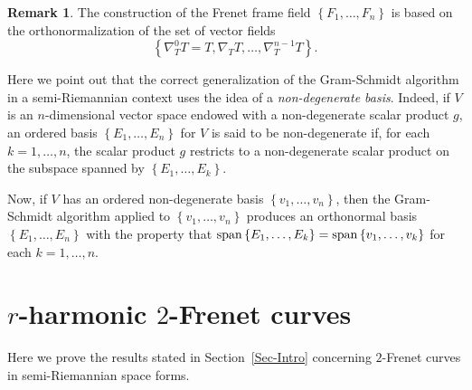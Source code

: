\documentclass[11pt]{amsart}
\theoremstyle{plain}
\theoremstyle{definition}
\newtheorem{remark}       [theorem]  {Remark}
\numberwithin{equation}{section}
\begin{document}
\begin{remark} 
The construction of the Frenet frame field $\left \{F_1,\ldots,F_n \right \}$ is based on the orthonormalization of the set of vector fields 
\[
\left \{\nabla_T^0T=T,\nabla_T T,\ldots,\nabla_T^{n-1}T \right \}.
\] 

Here we point out that the correct generalization of the Gram-Schmidt algorithm in a semi-Riemannian context uses the idea of a {\em non-degenerate basis}. Indeed, if $V$ is an $n$-dimensional vector space endowed with a non-degenerate scalar product $g$, an ordered basis $\left \{E_1,\ldots,E_n\right\}$
 for $V$
 is said to be non-degenerate if, for each $k=1,\ldots,n$, the scalar product $g$ restricts to a non-degenerate scalar product on the subspace spanned by $\left \{E_1,\ldots,E_k\right\}$.

Now, if $V$ has an ordered non-degenerate basis $\left \{v_1,\ldots,v_n\right\}$, then the Gram-Schmidt algorithm applied to $\left \{v_1,\ldots,v_n\right\}$ produces an orthonormal basis $\left \{E_1,\ldots,E_n\right\}$ with the property that ${\rm span}\left \{E_1,\ldots,E_k\right\}={\rm span}\left \{v_1,\ldots,v_k\right\}$ for each $k=1,\ldots,n$.
\end{remark}


\section{$r$-harmonic $2$-Frenet curves}\label{Sec-2-Frenet} 
Here we prove the results stated in Section~\ref{Sec-Intro} concerning $2$-Frenet curves in semi-Riemannian space forms.
\end{document}
